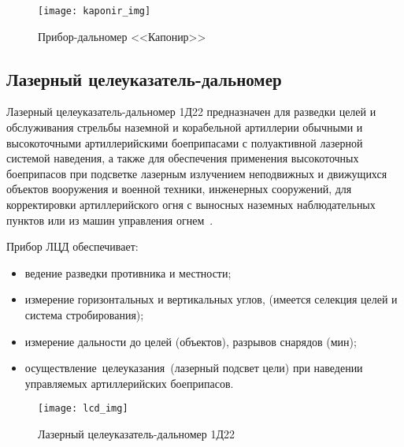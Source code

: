 \begin{figure}[ht]
	\centering
	\texttt{[image: kaponir\_img]}
	\caption{Прибор-дальномер <<Капонир>>~\cite{kaponir}}
	\label{fig:lit_reiview:kaponir:kaponir_img}
\end{figure}

\subsection{Лазерный целеуказатель-дальномер}
\label{sub:lit_review:lcd}
Лазерный целеуказатель-дальномер 1Д22 предназначен для разведки целей и обслуживания стрельбы наземной и корабельной
артиллерии обычными и высокоточными артиллерийскими боеприпасами с полуактивной лазерной системой наведения, а
также для обеспечения применения высокоточных боеприпасов при подсветке лазерным излучением неподвижных и движущихся объектов
вооружения и военной техники, инженерных сооружений, для корректировки артиллерийского огня с выносных наземных наблюдательных
пунктов или из машин управления огнем~\cite{lcd}.

Прибор ЛЦД обеспечивает: 
\begin{itemize}
	\item ведение разведки противника и местности;
	\item измерение горизонтальных и вертикальных углов, (имеется селекция целей и система стробирования);
	\item измерение дальности до целей (объектов), разрывов снарядов (мин);
	\item осуществление целеуказания (лазерный подсвет цели) при наведении управляемых артиллерийских боеприпасов.
\end{itemize}

\begin{figure}[ht]
	\centering
	\texttt{[image: lcd\_img]}
	\caption{Лазерный целеуказатель-дальномер 1Д22~\cite{lcd}}
	\label{fig:lit_reiview:lcd:lcd_img}
\end{figure}
